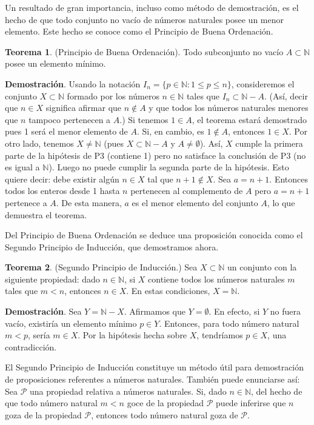 Un resultado de gran importancia, incluso como método de demostración, es el hecho de que todo conjunto no vacío de números naturales posee un menor elemento. Este hecho se conoce como el Principio de Buena Ordenación.

\textbf{Teorema 1}. (Principio de Buena Ordenación). Todo subconjunto no vacío \( A \subset \mathbb{N} \) posee un elemento mínimo.

\textbf{Demostración}. Usando la notación \( I_n = \{p \in \mathbb{N} : 1 \leq p \leq n\} \), consideremos el conjunto \( X \subset \mathbb{N} \) formado por los números \( n \in \mathbb{N} \) tales que \( I_n \subset \mathbb{N} - A \). (Así, decir que \( n \in X \) significa afirmar que \( n \notin A \) y que todos los números naturales menores que \( n \) tampoco pertenecen a \( A \).) Si tenemos \( 1 \in A \), el teorema estará demostrado pues 1 será el menor elemento de \( A \). Si, en cambio, es \( 1 \notin A \), entonces \( 1 \in X \). Por otro lado, tenemos \( X \neq \mathbb{N} \) (pues \( X \subset \mathbb{N} - A \) y \( A \neq \emptyset \)). Así, \( X \) cumple la primera parte de la hipótesis de P3 (contiene 1) pero no satisface la conclusión de P3 (no es igual a \(\mathbb{N}\)). Luego no puede cumplir la segunda parte de la hipótesis. Esto quiere decir: debe existir algún \( n \in X \) tal que \( n + 1 \notin X \). Sea \( a = n + 1 \). Entonces todos los enteros desde 1 hasta \( n \) pertenecen al complemento de \( A \) pero \( a = n + 1 \) pertenece a \( A \). De esta manera, \( a \) es el menor elemento del conjunto \( A \), lo que demuestra el teorema.

Del Principio de Buena Ordenación se deduce una proposición conocida como el Segundo Principio de Inducción, que demostramos ahora.

\textbf{Teorema 2}. (Segundo Principio de Inducción.) Sea \( X \subset \mathbb{N} \) un conjunto con la siguiente propiedad: dado \( n \in \mathbb{N} \), si \( X \) contiene todos los números naturales \( m \) tales que \( m < n \), entonces \( n \in X \). En estas condiciones, \( X = \mathbb{N} \).

\textbf{Demostración}. Sea \( Y = \mathbb{N} - X \). Afirmamos que \( Y = \emptyset \). En efecto, si \( Y \) no fuera vacío, existiría un elemento mínimo \( p \in Y \). Entonces, para todo número natural \( m < p \), sería \( m \in X \). Por la hipótesis hecha sobre \( X \), tendríamos \( p \in X \), una contradicción.

El Segundo Principio de Inducción constituye un método útil para demostración de proposiciones referentes a números naturales. También puede enunciarse así: Sea \( \mathcal{P} \) una propiedad relativa a números naturales. Si, dado \( n \in \mathbb{N} \), del hecho de que todo número natural \( m < n \) goce de la propiedad \( \mathcal{P} \) puede inferirse que \( n \) goza de la propiedad \( \mathcal{P} \), entonces todo número natural goza de \( \mathcal{P} \).

